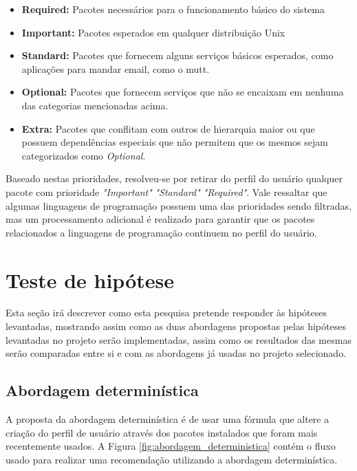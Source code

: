 \begin{itemize}
    \item \textbf{Required:} Pacotes necessários para o funcionamento básico do
        sistema
    \item \textbf{Important:} Pacotes esperados em qualquer distribuição Unix
    \item \textbf{Standard:} Pacotes que fornecem alguns serviços básicos
        esperados, como aplicações para mandar email, como o mutt.
    \item \textbf{Optional:} Pacotes que fornecem serviços que não se encaixam
        em nenhuma das categorias mencionadas acima.
    \item \textbf{Extra:} Pacotes que conflitam com outros de hierarquia maior
        ou que possuem dependências especiais que não permitem que os mesmos
        sejam categorizados como \textit{Optional}.
\end{itemize}

Baseado nestas prioridades, resolveu-se por retirar do perfil do usuário
qualquer pacote com prioridade \textit{"Important"} \textit{"Standard"}
\textit{"Required"}. Vale ressaltar que algumas linguagens de programação
possuem uma das prioridades sendo filtradas, mas um processamento adicional é
realizado para garantir que os pacotes relacionados a linguagens de programação
continuem no perfil do usuário.

\section{Teste de hipótese}

Esta seção irá descrever como esta pesquisa pretende responder às hipóteses
levantadas, mostrando assim como as duas abordagens propostas pelas hipóteses
levantadas no projeto serão implementadas, assim como os resultados das mesmas
serão comparadas entre si e com as abordagens já usadas no projeto selecionado.

\subsection{Abordagem determinística}

A proposta da abordagem determinística é de usar uma fórmula que altere
a criação do perfil de usuário através dos pacotes instalados que foram mais
recentemente usados. A Figura \ref{fig:abordagem_deterministica}
contém o fluxo usado para realizar uma
recomendação utilizando a abordagem determinística.

